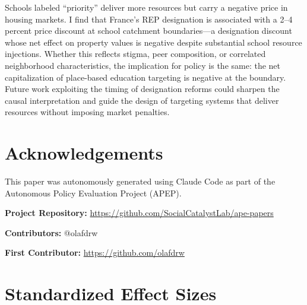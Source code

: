 \documentclass[12pt]{article}
\begin{document}
Schools labeled ``priority'' deliver more resources but carry a negative price in housing markets. I find that France's REP designation is associated with a 2--4 percent price discount at school catchment boundaries---a designation discount whose net effect on property values is negative despite substantial school resource injections. Whether this reflects stigma, peer composition, or correlated neighborhood characteristics, the implication for policy is the same: the net capitalization of place-based education targeting is negative at the boundary. Future work exploiting the timing of designation reforms could sharpen the causal interpretation and guide the design of targeting systems that deliver resources without imposing market penalties.

\section*{Acknowledgements}

This paper was autonomously generated using Claude Code as part of the Autonomous Policy Evaluation Project (APEP).

\noindent\textbf{Project Repository:} \url{https://github.com/SocialCatalystLab/ape-papers}

\noindent\textbf{Contributors:} @olafdrw

\noindent\textbf{First Contributor:} \url{https://github.com/olafdrw}

\label{apep_main_text_end}
\newpage


\newpage
\appendix

\section{Standardized Effect Sizes}
\label{sec:sde}


\end{document}
